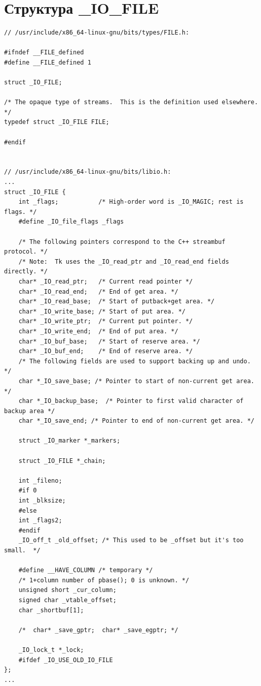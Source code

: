 \chapter{Структура \_IO\_FILE}

\begin{center}
\captionsetup{justification=raggedright,singlelinecheck=off}
\begin{lstlisting}[label=lst:add,caption=Структура \_IO\_FILE]
// /usr/include/x86_64-linux-gnu/bits/types/FILE.h:

#ifndef __FILE_defined
#define __FILE_defined 1

struct _IO_FILE;

/* The opaque type of streams.  This is the definition used elsewhere.  */
typedef struct _IO_FILE FILE;

#endif


// /usr/include/x86_64-linux-gnu/bits/libio.h:
...
struct _IO_FILE {
	int _flags;           /* High-order word is _IO_MAGIC; rest is flags. */
	#define _IO_file_flags _flags
	
	/* The following pointers correspond to the C++ streambuf protocol. */
	/* Note:  Tk uses the _IO_read_ptr and _IO_read_end fields directly. */
	char* _IO_read_ptr;   /* Current read pointer */
	char* _IO_read_end;   /* End of get area. */
	char* _IO_read_base;  /* Start of putback+get area. */
	char* _IO_write_base; /* Start of put area. */
	char* _IO_write_ptr;  /* Current put pointer. */
	char* _IO_write_end;  /* End of put area. */
	char* _IO_buf_base;   /* Start of reserve area. */
	char* _IO_buf_end;    /* End of reserve area. */
	/* The following fields are used to support backing up and undo. */
	char *_IO_save_base; /* Pointer to start of non-current get area. */
	char *_IO_backup_base;  /* Pointer to first valid character of backup area */
	char *_IO_save_end; /* Pointer to end of non-current get area. */
	
	struct _IO_marker *_markers;
	
	struct _IO_FILE *_chain;
	
	int _fileno;
	#if 0
	int _blksize;
	#else
	int _flags2;
	#endif
	_IO_off_t _old_offset; /* This used to be _offset but it's too small.  */
	
	#define __HAVE_COLUMN /* temporary */
	/* 1+column number of pbase(); 0 is unknown. */
	unsigned short _cur_column;
	signed char _vtable_offset;
	char _shortbuf[1];
	
	/*  char* _save_gptr;  char* _save_egptr; */
	
	_IO_lock_t *_lock;
	#ifdef _IO_USE_OLD_IO_FILE
};
...

\end{lstlisting}
\end{center}


